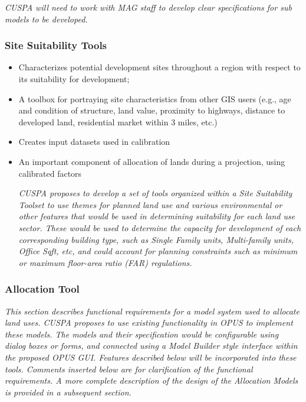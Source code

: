 \emph{CUSPA will need to work with MAG staff to develop clear specifications for sub models to be developed.}


\subsubsection{Site Suitability Tools}
\begin{itemize}
\item Characterizes potential development sites throughout a region with respect to its suitability for development;
\item A toolbox for portraying site characteristics from other GIS users (e.g., age and condition of structure, land value, proximity to highways, distance to developed land, residential market within 3 miles, etc.)
\item Creates input datasets used in calibration
\item An important component of allocation of lands during a projection, using calibrated factors

\emph{CUSPA proposes to develop a set of tools organized within a Site Suitability Toolset to use themes for planned land use and various environmental or other features that would be used in determining suitability for each land use sector.  These would be used to determine the capacity for development of each corresponding building type, such as Single Family units, Multi-family units, Office Sqft, etc, and could account for planning constraints such as minimum or maximum floor-area ratio (FAR) regulations.}

\end{itemize}

\subsubsection{Allocation Tool}

\emph{This section describes functional requirements for a model system used to allocate land uses.  CUSPA proposes to use existing functionality in OPUS to implement these models.  The models and their specification would be configurable using dialog boxes or forms, and connected using a Model Builder style interface within the proposed OPUS GUI.  Features described below will be incorporated into these tools.  Comments inserted below are for clarification of the functional requirements.  A more complete description of the design of the Allocation Models is provided in a subsequent section.}

